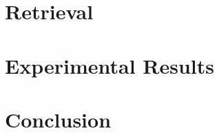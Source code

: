 \documentclass[twocolumn, 10pt]{article}
\begin{document}
\section{Retrieval}
\section{Experimental Results}

\section{Conclusion}



\end{document}
